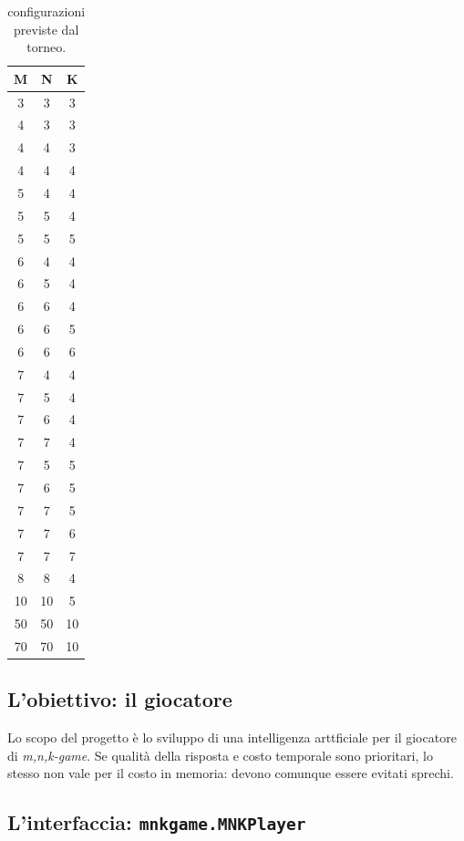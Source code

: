 \documentclass{article}
\begin{document}
\begin{table}[h!]
\centering
\begin{tabular}{ | c | c | c | }
  \hline
  M & N & K \\
  \hline
  3 & 3 & 3 \\
  \hline
  4 & 3 & 3 \\
  \hline
  4 & 4 & 3 \\
  \hline
  4 & 4 & 4 \\
  \hline
  5 & 4 & 4 \\
  \hline
  5 & 5 & 4 \\
  \hline
  5 & 5 & 5 \\
  \hline
  6 & 4 & 4 \\
  \hline
  6 & 5 & 4 \\
  \hline
  6 & 6 & 4 \\
  \hline
  6 & 6 & 5 \\
  \hline
  6 & 6 & 6 \\
  \hline
  7 & 4 & 4 \\
  \hline
  7 & 5 & 4 \\
  \hline
  7 & 6 & 4 \\
  \hline
  7 & 7 & 4 \\
  \hline
  7 & 5 & 5 \\
  \hline
  7 & 6 & 5 \\
  \hline
  7 & 7 & 5 \\
  \hline
  7 & 7 & 6 \\
  \hline
  7 & 7 & 7 \\
  \hline
  8 & 8 & 4 \\
  \hline
  10 & 10 & 5 \\
  \hline
  50 & 50 & 10 \\
  \hline
  70 & 70 & 10 \\
  \hline
\end{tabular}
  \caption{configurazioni previste dal torneo.}
  \label{table:1}
\end{table}

\subsection{L'obiettivo: il giocatore}

Lo scopo del progetto è lo sviluppo di una intelligenza arttficiale per il
giocatore di \emph{m,n,k-game}. Se qualità della risposta e costo temporale
sono prioritari, lo stesso non vale per il costo in memoria: devono comunque
essere evitati sprechi.

\subsection{L'interfaccia: \texttt{mnkgame.MNKPlayer}}
\end{document}
